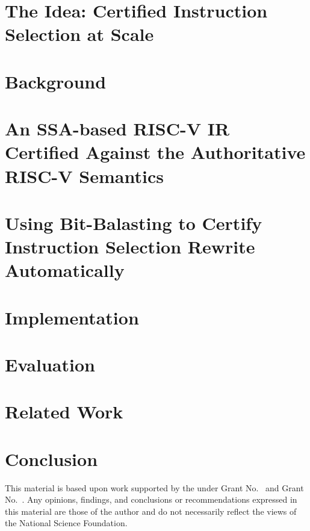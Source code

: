 \documentclass[review, anonymous, acmsmall, screen]{acmart}
\begin{document}
\section{The Idea: Certified Instruction Selection at Scale}
\label{sec:idea}


\section{Background}
\label{sec:background}


\section{An SSA-based RISC-V IR Certified Against the Authoritative RISC-V Semantics}
\label{sec:riscv-ssa}

\section{Using Bit-Balasting to Certify Instruction Selection Rewrite Automatically}
\label{sec:inst-selection-automation}

\section{Implementation}
\label{sec:implementation}

\section{Evaluation}
\label{sec:evaluation}

\section{Related Work}

\section{Conclusion}

\begin{acks}                            %
  This material is based upon work supported by the
   under Grant
  No.~ and Grant
  No.~.  Any opinions, findings, and
  conclusions or recommendations expressed in this material are those
  of the author and do not necessarily reflect the views of the
  National Science Foundation.
\end{acks}
\end{document}
